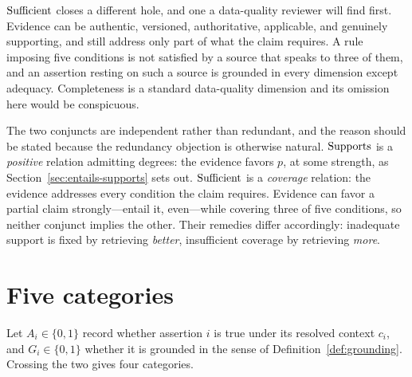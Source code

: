 $\operatorname{Sufficient}$ closes a different hole, and one a data-quality reviewer will find
first. Evidence can be authentic, versioned, authoritative, applicable, and genuinely
supporting, and still address only part of what the claim requires. A rule imposing
five conditions is not satisfied by a source that speaks to three of them, and an
assertion resting on such a source is grounded in every dimension except adequacy.
Completeness is a standard data-quality dimension and its omission here would be
conspicuous.

The two conjuncts are independent rather than redundant, and the reason should be
stated because the redundancy objection is otherwise natural. $\operatorname{Supports}$ is a
\emph{positive} relation admitting degrees: the evidence favors $p$, at some strength,
as Section~\ref{sec:entails-supports} sets out. $\operatorname{Sufficient}$ is a \emph{coverage}
relation: the evidence addresses every condition the claim requires. Evidence can favor
a partial claim strongly---entail it, even---while covering three of five conditions, so
neither conjunct implies the other. Their remedies differ accordingly: inadequate support
is fixed by retrieving \emph{better}, insufficient coverage by retrieving \emph{more}.

\section{Five categories}

Let $A_i \in \{0,1\}$ record whether assertion $i$ is true under its resolved
context $c_i$, and $G_i \in \{0,1\}$ whether it is grounded in the sense of
Definition~\ref{def:grounding}. Crossing the two gives four categories.

